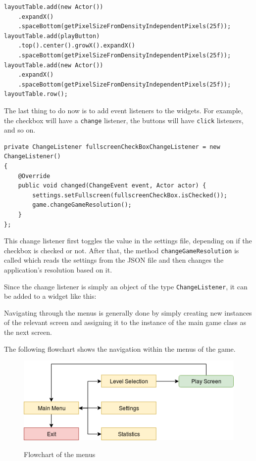 \documentclass[12p]{article}
\begin{document}
\begin{verbatim}
layoutTable.add(new Actor())
    .expandX()
    .spaceBottom(getPixelSizeFromDensityIndependentPixels(25f));
layoutTable.add(playButton)
    .top().center().growX().expandX()
    .spaceBottom(getPixelSizeFromDensityIndependentPixels(25f));
layoutTable.add(new Actor())
    .expandX()
    .spaceBottom(getPixelSizeFromDensityIndependentPixels(25f));
layoutTable.row();
\end{verbatim}

The last thing to do now is to add event listeners to the widgets. For example, the checkbox will have a \texttt{change} listener, the buttons will have \texttt{click} listeners, and so on.

\begin{verbatim}
private ChangeListener fullscreenCheckBoxChangeListener = new ChangeListener() 
{
    @Override
    public void changed(ChangeEvent event, Actor actor) {
        settings.setFullscreen(fullscreenCheckBox.isChecked());
        game.changeGameResolution();
    }
};
\end{verbatim}

This change listener first toggles the value in the settings file, depending on if the checkbox is checked or not. After that, the method \texttt{changeGameResolution} is called which reads the settings from the JSON file and then changes the application's resolution based on it.

Since the change listener is simply an object of the type \texttt{ChangeListener}, it can be added to a widget like this:


Navigating through the menus is generally done by simply creating new instances of the relevant screen and assigning it to the instance of the main game class as the next screen.

The following flowchart shows the navigation within the menus of the game.

\begin{figure}[ht]
  \center
  \includegraphics[width=1\textwidth]{Documentation/flowchart.png}
  \label{fig:flowchart}
  \caption{Flowchart of the menus}
\end{figure}
\end{document}
